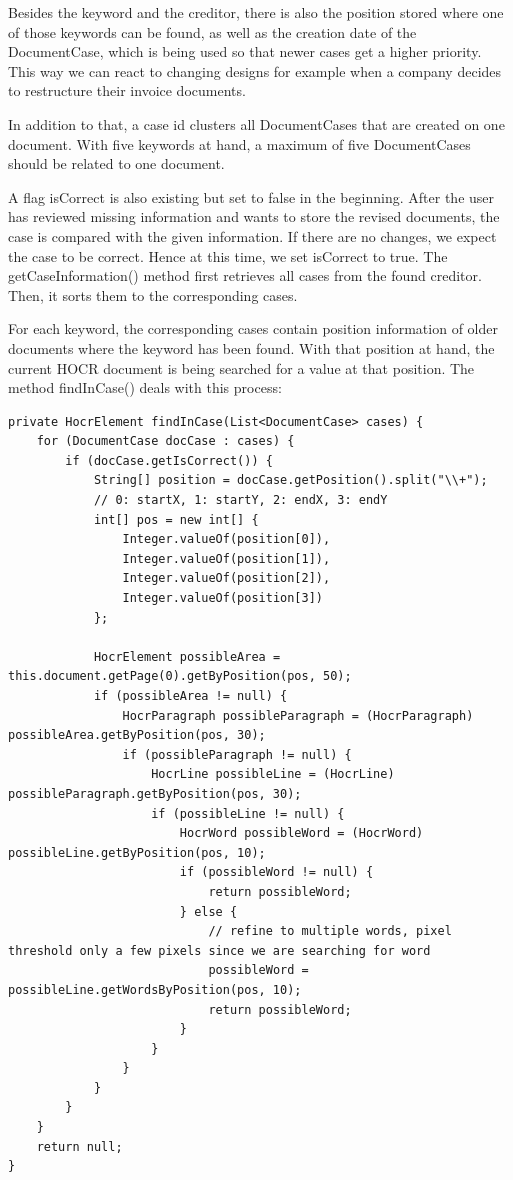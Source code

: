 Besides the keyword and the creditor, there is also the position stored where one of those keywords can be found, as well as the creation date of the DocumentCase, which is being used so that newer cases get a higher priority. This way we can react to changing designs for example when a company decides to restructure their invoice documents.

In addition to that, a case id clusters all DocumentCases that are created on one document. With five keywords at hand, a maximum of five DocumentCases should be related to one document.

A flag isCorrect is also existing but set to false in the beginning. After the user has reviewed missing information and wants to store the revised documents, the case is compared with the given information. If there are no changes, we expect the case to be correct. Hence at this time, we set isCorrect to true.
The getCaseInformation() method first retrieves all cases from the found creditor. Then, it sorts them to the corresponding cases.

For each keyword, the corresponding cases contain position information of older documents where the keyword has been found. With that position at hand, the current HOCR document is being searched for a value at that position. The method findInCase() deals with this process:

\begin{lstlisting}[caption={Search for information in the DocumentCase}]
private HocrElement findInCase(List<DocumentCase> cases) {
    for (DocumentCase docCase : cases) {
        if (docCase.getIsCorrect()) {
            String[] position = docCase.getPosition().split("\\+");
            // 0: startX, 1: startY, 2: endX, 3: endY
            int[] pos = new int[] {
				Integer.valueOf(position[0]), 
				Integer.valueOf(position[1]), 
				Integer.valueOf(position[2]), 
				Integer.valueOf(position[3])
			};

            HocrElement possibleArea = this.document.getPage(0).getByPosition(pos, 50);
            if (possibleArea != null) {
                HocrParagraph possibleParagraph = (HocrParagraph)  possibleArea.getByPosition(pos, 30);
                if (possibleParagraph != null) {
                    HocrLine possibleLine = (HocrLine) possibleParagraph.getByPosition(pos, 30);
                    if (possibleLine != null) {
                        HocrWord possibleWord = (HocrWord) possibleLine.getByPosition(pos, 10);
                        if (possibleWord != null) {
                            return possibleWord;
                        } else {
                            // refine to multiple words, pixel threshold only a few pixels since we are searching for word
                            possibleWord = possibleLine.getWordsByPosition(pos, 10);
                            return possibleWord;
                        }
                    }
                }
            }
        }
    }
    return null;
}
\end{lstlisting}

